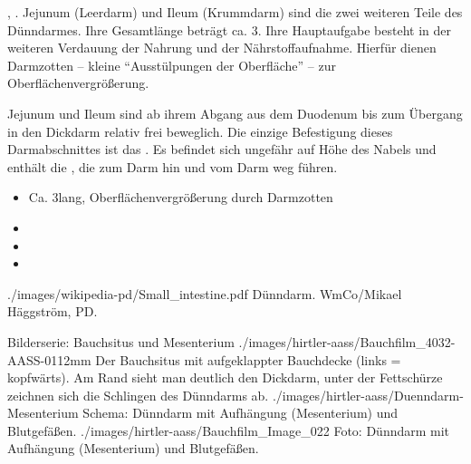 {%
%
%
 , . Jejunum (Leerdarm) und Ileum (Krummdarm) sind die zwei
weiteren Teile des Dünndarmes. Ihre Gesamtlänge beträgt ca.
3\Meter* . Ihre Hauptaufgabe besteht in der weiteren
Verdauung der Nahrung und der Nährstoffaufnahme. Hierfür
dienen Darmzotten -- kleine \protect\enquote{Ausstülpungen
der Oberfläche} -- zur Oberflächenvergrößerung.

\label{topic:mesenterium}
Jejunum und Ileum sind ab ihrem Abgang aus dem Duodenum bis
zum Übergang in den Dickdarm relativ frei beweglich. Die
einzige Befestigung dieses Darmabschnittes ist das
 . Es befindet sich ungefähr
auf Höhe des Nabels und enthält die , die zum
Darm hin und vom Darm weg führen.

}
{
\begin{itemize}
    \item Ca. 3\Meter* lang, Oberflächenvergrößerung durch Darm\-zotten
    \item {}
    \item {}
    \item {}
\end{itemize}
}
{./images/wikipedia-pd/Small_intestine.pdf}
{Dünndarm.}
{WmCo/Mikael Häggström, PD.}

\begin{PictureSeriesWide}{}{Bilderserie: Bauchsitus und
Mesenterium}
{./images/hirtler-aass/Bauchfilm_4032-AASS-0112mm}
{Der Bauchsitus mit aufgeklappter
Bauchdecke (links = kopfwärts). Am Rand sieht man deutlich
den Dickdarm, unter der Fettschürze zeichnen sich die
Schlingen des Dünndarms ab. }
{./images/hirtler-aass/Duenndarm-Mesenterium}
{Schema: Dünndarm mit Aufhängung
(Mesenterium) und Blutgefäßen. }
{./images/hirtler-aass/Bauchfilm_Image_022}
{Foto: Dünndarm mit Aufhängung
(Mesenterium) und Blutgefäßen. }
{}
{}
\end{PictureSeriesWide}





